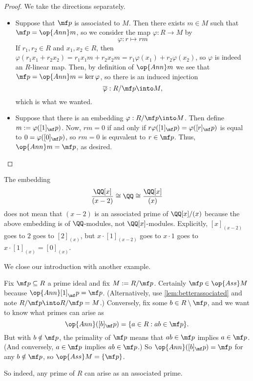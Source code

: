 \begin{proof}
	We take the directions separately.
	\begin{itemize}
		\item Suppose that $\mf p$ is associated to $M$. Then there exists $m\in M$ such that $\mf p=\op{Ann}m$, so we consider the map $\varphi:R\to M$ by
		\[\varphi:r\mapsto rm\]
		If $r_1,r_2\in R$ and $x_1,x_2\in R$, then $\varphi(r_1x_1+r_2x_2)=r_1x_1m+r_2x_2m=r_1\varphi(x_1)+r_2\varphi(x_2)$, so $\varphi$ is indeed an $R$-linear map. Then, by definition of $\op{Ann}m$ we see that $\mf p=\op{Ann}m=\ker\varphi$, so there is an induced injection
		\[\overline\varphi:R/\mf p\into M,\]
		which is what we wanted.
		\item Suppose that there is an embedding $\varphi:R/\mf p\into M$. Then define $m:=\varphi([1]_\mf p)$. Now, $rm=0$ if and only if $r\varphi([1]_\mf p)=\varphi([r]_\mf p)$ is equal to $0=\varphi([0]_\mf p)$, so $rm=0$ is equvalent to $r\in\mf p$. Thus, $\op{Ann}m=\mf p$, as desired.
		\qedhere
	\end{itemize}
\end{proof}
\begin{remark}[Nir]
	The embedding
	\[\frac{\QQ[x]}{(x-2)}\cong\QQ\cong\frac{\QQ[x]}{(x)}\]
	does not mean that $(x-2)$ is an associated prime of $\QQ[x]/(x)$ because the above embedding is of $\QQ$-modules, not $\QQ[x]$-modules. Explicitly, $[x]_{(x-2)}$ goes to $2$ goes to $[2]_{(x)}$, but $x\cdot[1]_{(x-2)}$ goes to $x\cdot1$ goes to $x\cdot[1]_{(x)}=[0]_{(x)}$.
\end{remark}
We close our introduction with another example.
\begin{example}
	Fix $\mf p\subseteq R$ a prime ideal and fix $M:=R/\mf p$. Certainly $\mf p\in\op{Ass}M$ because $\op{Ann}[1]_\mf p=\mf p$. (Alternatively, use \autoref{lem:betterassociated} and note $R/\mf p\into R/\mf p=M$.) Conversely, fix some $b\in R\setminus\mf p$, and we want to know what primes can arise as
	\[\op{Ann}([b]_\mf p)=\{a\in R:ab\in\mf p\}.\]
	But with $b\notin\mf p$, the primality of $\mf p$ means that $ab\in\mf p$ implies $a\in\mf p$. (And conversely, $a\in\mf p$ implies $ab\in\mf p$.) So $\op{Ann}([b]_\mf p)=\mf p$ for any $b\notin\mf p$, so $\op{Ass}M=\{\mf p\}$.
\end{example}
So indeed, any prime of $R$ can arise as an associated prime.

